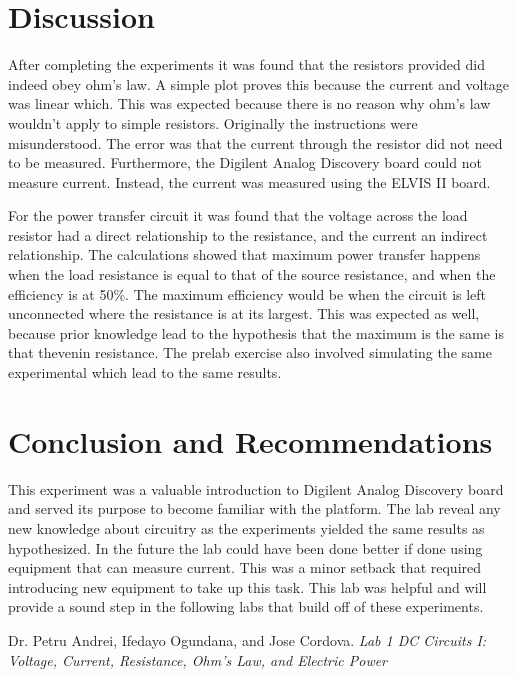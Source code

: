 \documentclass{article}
\begin{document}
  \clearpage

  \section{Discussion}
\label{sec:Discussion}
After completing the experiments it was found that the resistors
provided did indeed obey ohm's law. A simple plot proves this because
the current and voltage was linear which. This was expected because there
is no reason why ohm's law wouldn't apply to simple resistors. Originally
the instructions were misunderstood. The error was that the current through the
resistor did not need to be measured. Furthermore, the Digilent Analog
Discovery board could not measure current. Instead, the current was measured
using the ELVIS II board.

For the power transfer circuit it was found that the voltage across
the load resistor had a direct relationship to the resistance, and the current an indirect
relationship. The calculations showed that maximum power transfer happens when the
load resistance is equal to that of the source resistance, and when the efficiency is at 50\%.
The maximum efficiency would be when the circuit is left unconnected where the resistance is
at its largest. This was expected as well, because prior knowledge lead to the
hypothesis that the maximum is the same is that thevenin resistance. The prelab
exercise also involved simulating the same experimental which lead to the same
results.

\section{Conclusion and Recommendations}
\label{sec:Conclusion}
This experiment was a valuable introduction to Digilent Analog Discovery board
and served its purpose to become familiar with the platform. The lab reveal any
new knowledge about circuitry as the experiments yielded the same results as
hypothesized. In the future the lab could have been done better if done using
equipment that can measure current. This was a minor setback that required
introducing new equipment to take up this task. This lab was helpful and will
provide a sound step in the following labs that build off of these experiments.
  \clearpage

  \begin{thebibliography}{9}
    Dr. Petru Andrei, Ifedayo Ogundana, and Jose Cordova.
    \textit{Lab 1 DC Circuits I: Voltage, Current, Resistance, Ohm’s Law, and Electric Power}
  \end{thebibliography}
\end{document}

